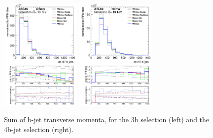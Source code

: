 \begin{figure}[!htb]
\centering
\includegraphics[width=0.35\textwidth]{Plots/ttbb/hisgenHTbjets_4j3t__div}
\includegraphics[width=0.35\textwidth]{Plots/ttbb/hisgenHTbjets_4j4t__div}
  \caption{Sum of b-jet transverse momenta, for the 3b selection (left) and the 4b-jet selection (right). \label{ttbb:HTbjets}}
\end{figure}


